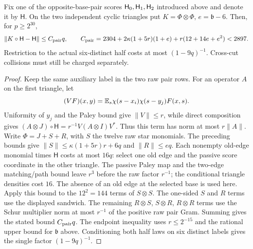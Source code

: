 \begin{lemma}\label{lem:native-pair-linear}
Fix one of the opposite-base-pair scores $\mathsf H_{0},\mathsf H_{1},\mathsf H_{2}$ introduced
above and denote it by $\mathsf H$. On the two independent cyclic
triangles put
$K=\Phi\otimes\Phi$, $e=\mathfrak b-6$. Then, for $p\ge2^{30}$,
\[
 \|K\circ\mathsf H-\mathsf H\|\le C_{\rm pair}q,\qquad
 C_{\rm pair}=2304+2\kappa(1+5r)(1+e)
                    +r(12+14e+e^2)<2897.
\]
Restriction to the actual six-distinct half costs at most
$(1-9q)^{-1}$. Cross-cut collisions must still be charged separately.
\end{lemma}
\begin{proof}
Keep the same auxiliary label in the two raw pair rows. For an
operator $A$ on the first triangle, let
\[
 (VF)(x,y)=\mathbb E_s\chi(s-x_i)\chi(s-y_j)F(x,s).
\]
Uniformity of $y_j$ and the Paley bound give $\|V\|\le r$, while
direct composition gives
$(A\otimes J)\circ\mathsf H=r^{-1}V(A\otimes I)V^*$.
Thus this term has norm at most $r\|A\|$.
Write $\Phi=J+S+R$, with $S$ the twelve raw star monomials.
The preceding bounds give
$\|S\|\le\kappa(1+5r)r+6q$ and $\|R\|\le eq$.
Each nonempty old-edge monomial times $\mathsf H$ costs at most
$16q$: select one old edge and the passive score coordinate in
the other triangle. The passive Paley map and the two-edge
matching/path bound leave $r^3$ before the raw factor $r^{-1}$;
the conditional triangle densities cost $16$. The absence of an
old edge at the selected base is used here.
Apply this bound to the $12^2=144$ terms of $S\otimes S$.
The one-sided $S$ and $R$ terms use the displayed sandwich.
The remaining $R\otimes S$, $S\otimes R$, $R\otimes R$ terms
use the Schur multiplier norm at most $r^{-1}$ of the positive
raw pair Gram. Summing gives the stated bound $C_{\rm pair}q$.
The endpoint inequality uses $r\le2^{-15}$ and the rational
upper bound for $\mathfrak b$ above. Conditioning both half laws
on six distinct labels gives the single factor $(1-9q)^{-1}$.
\end{proof}

